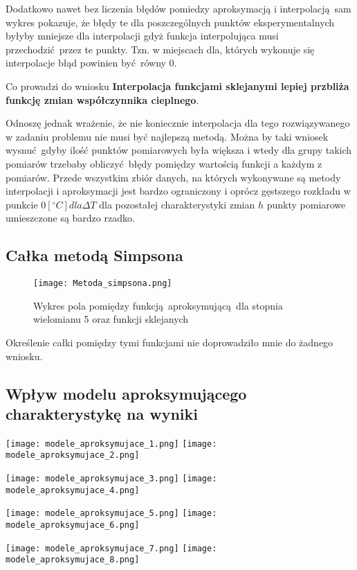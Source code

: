 \documentclass[varwidth,12pt,a4paper]{article}
\begin{document}
Dodatkowo nawet bez liczenia błędów pomiedzy aproksymacją i interpolacją sam wykres pokazuje, że błędy te
dla poszczególnych punktów eksperymentalnych byłyby mniejsze dla interpolacji gdyż funkcja interpolująca musi 
przechodzić przez te punkty. Tzn. w miejscach dla, których wykonuje się interpolacje błąd powinien być równy $0$.

Co prowadzi do wniosku \textbf{Interpolacja funkcjami sklejanymi lepiej przbliża funkcję zmian współczynnika cieplnego}.

Odnoszę jednak wrażenie, że nie koniecznie interpolacja dla tego rozwiązywanego w zadaniu problemu nie musi być najlepszą metodą.
Można by taki wniosek wysnuć gdyby ilość punktów pomiarowych była większa i wtedy dla grupy takich pomiarów
trzebaby obliczyć błędy pomiędzy wartością funkcji a każdym z pomiarów. Przede wszystkim zbiór danych, na których
wykonywane są metody interpolacji i aproksymacji jest bardzo ograniczony i oprócz gęstszego rozkładu w punkcie
$0 [^\circ C] dla \Delta T$ dla pozostałej charakterystyki zmian $h$ punkty pomiarowe umieszczone są bardzo rzadko.

\subsection{Całka metodą Simpsona}

\begin{figure}[H]
    \texttt{[image: Metoda\_simpsona.png]} 
    \caption{Wykres pola pomiędzy funkcją aproksymującą dla stopnia wielomianu 5 oraz funkcji sklejanych}
    \label{fig:calkaSimpsona}
\end{figure}

Określenie całki pomiędzy tymi funkcjami nie doprowadziło mnie do żadnego wniosku.

\subsection{Wpływ modelu aproksymującego charakterystykę na wyniki}

\texttt{[image: modele\_aproksymujace\_1.png]}\hspace{0.1\textwidth}%
\texttt{[image: modele\_aproksymujace\_2.png]}\par
\texttt{[image: modele\_aproksymujace\_3.png]}\hspace{0.1\textwidth}%
\texttt{[image: modele\_aproksymujace\_4.png]}\par
\texttt{[image: modele\_aproksymujace\_5.png]}\hspace{0.1\textwidth}%
\texttt{[image: modele\_aproksymujace\_6.png]}\par
\texttt{[image: modele\_aproksymujace\_7.png]}\hspace{0.1\textwidth}%
\texttt{[image: modele\_aproksymujace\_8.png]}\par
\end{document}
